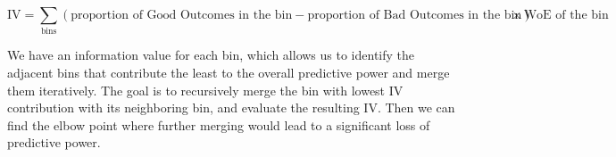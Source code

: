 \documentclass[
  english,
  11pt,
]{article}
\newenvironment{Shaded}{\begin{snugshade}}{\end{snugshade}}
\newcommand{\AttributeTok}[1]{\textcolor[rgb]{0.13,0.29,0.53}{#1}}
\newcommand{\ConstantTok}[1]{\textcolor[rgb]{0.56,0.35,0.01}{#1}}
\newcommand{\ControlFlowTok}[1]{\textcolor[rgb]{0.13,0.29,0.53}{\textbf{#1}}}
\newcommand{\DecValTok}[1]{\textcolor[rgb]{0.00,0.00,0.81}{#1}}
\newcommand{\FunctionTok}[1]{\textcolor[rgb]{0.13,0.29,0.53}{\textbf{#1}}}
\newcommand{\NormalTok}[1]{#1}
\newcommand{\OtherTok}[1]{\textcolor[rgb]{0.56,0.35,0.01}{#1}}
\newcommand{\SpecialCharTok}[1]{\textcolor[rgb]{0.81,0.36,0.00}{\textbf{#1}}}
\newcommand{\StringTok}[1]{\textcolor[rgb]{0.31,0.60,0.02}{#1}}
\begin{document}
\[\text{IV} = \sum_{\text{bins}} (\text{proportion of Good Outcomes in the bin} - \text{proportion of Bad Outcomes in the bin}) \times \text{WoE of the bin}\]

We have an information value for each bin, which allows us to identify
the adjacent bins that contribute the least to the overall predictive
power and merge them iteratively. The goal is to recursively merge the
bin with lowest IV contribution with its neighboring bin, and evaluate
the resulting IV. Then we can find the elbow point where further merging
would lead to a significant loss of predictive power.

\begin{Shaded}
\end{Shaded}
\end{document}
